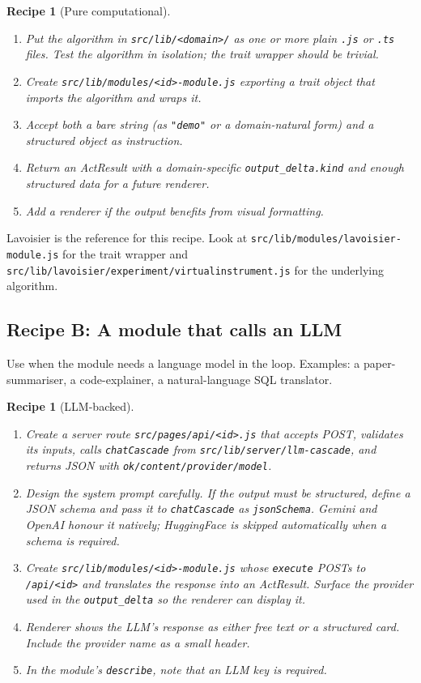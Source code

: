 \documentclass[11pt,a4paper]{article}
\theoremstyle{contract}
\newtheorem{recipe}[contract]{Recipe}
\begin{document}
\begin{recipe}[Pure computational]
\label{recipe:pure}
\begin{enumerate}[leftmargin=1.4em,itemsep=1pt]
\item Put the algorithm in \texttt{src/lib/<domain>/} as one or more
plain \texttt{.js} or \texttt{.ts} files. Test the algorithm in
isolation; the trait wrapper should be trivial.
\item Create \texttt{src/lib/modules/<id>-module.js} exporting a trait
object that imports the algorithm and wraps it.
\item Accept both a bare string (as \texttt{"demo"} or a domain-natural
form) and a structured object as instruction.
\item Return an ActResult with a domain-specific \texttt{output\_delta.kind}
and enough structured data for a future renderer.
\item Add a renderer if the output benefits from visual formatting.
\end{enumerate}
\end{recipe}

Lavoisier is the reference for this recipe. Look at
\texttt{src/lib/modules/lavoisier-module.js} for the trait wrapper and
\texttt{src/lib/lavoisier/experiment/virtualinstrument.js} for the
underlying algorithm.

\subsection{Recipe B: A module that calls an LLM}

Use when the module needs a language model in the loop. Examples: a
paper-summariser, a code-explainer, a natural-language SQL translator.

\begin{recipe}[LLM-backed]
\label{recipe:llm}
\begin{enumerate}[leftmargin=1.4em,itemsep=1pt]
\item Create a server route \texttt{src/pages/api/<id>.js} that accepts
POST, validates its inputs, calls \texttt{chatCascade} from
\texttt{src/lib/server/llm-cascade}, and returns JSON with
\texttt{ok/content/provider/model}.
\item Design the system prompt carefully. If the output must be
structured, define a JSON schema and pass it to \texttt{chatCascade} as
\texttt{jsonSchema}. Gemini and OpenAI honour it natively; HuggingFace
is skipped automatically when a schema is required.
\item Create \texttt{src/lib/modules/<id>-module.js} whose \texttt{execute}
POSTs to \texttt{/api/<id>} and translates the response into an
ActResult. Surface the provider used in the \texttt{output\_delta} so
the renderer can display it.
\item Renderer shows the LLM's response as either free text or a
structured card. Include the provider name as a small header.
\item In the module's \texttt{describe}, note that an LLM key is
required.
\end{enumerate}
\end{recipe}
\end{document}
